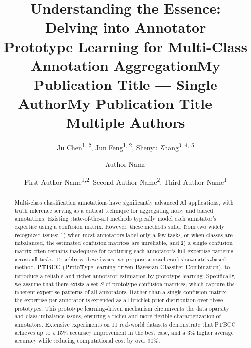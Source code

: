 \documentclass[letterpaper]{article} %
\title{Understanding the Essence: Delving into Annotator\\ Prototype Learning for Multi-Class Annotation Aggregation}
\author{
    Ju Chen\textsuperscript{\rm 1, \rm 2}, Jun Feng\textsuperscript{\rm 1, \rm 2}, Shenyu Zhang\textsuperscript{\rm 3, \rm 4, \rm 5}\\
}
\title{My Publication Title --- Single Author}
\author {
    Author Name
}
\title{My Publication Title --- Multiple Authors}
\author {
    First Author Name\textsuperscript{\rm 1,\rm 2},
    Second Author Name\textsuperscript{\rm 2},
    Third Author Name\textsuperscript{\rm 1}
}
\begin{document}
\maketitle

\begin{abstract}
Multi-class classification annotations have significantly advanced AI applications, with truth inference serving as a critical technique for aggregating noisy and biased annotations. Existing state-of-the-art methods typically model each annotator's expertise using a confusion matrix. However, these methods suffer from two widely recognized issues: 1) when most annotators label only a few tasks, or when classes are imbalanced, the estimated confusion matrices are unreliable, and 2) a single confusion matrix often remains inadequate for capturing each annotator's full expertise patterns across all tasks. To address these issues, we propose a novel confusion-matrix-based method, \textbf{PTBCC} (\textbf{P}roto\textbf{T}ype learning-driven \textbf{B}ayesian \textbf{C}lassifier \textbf{C}ombination), to introduce a reliable and richer annotator estimation by prototype learning. Specifically, we assume that there exists a set $S$ of prototype confusion matrices, which capture the inherent expertise patterns of all annotators. Rather than a single confusion matrix, the expertise per annotator is extended as a Dirichlet prior distribution over these prototypes. This prototype learning-driven mechanism circumvents the data sparsity and class imbalance issues, ensuring a richer and more flexible characterization of annotators. Extensive experiments on 11 real-world datasets demonstrate that PTBCC achieves up to a 15\% accuracy improvement in the best case, and a 3\% higher average accuracy while reducing computational cost by over 90\%.
\end{abstract}

\end{document}
